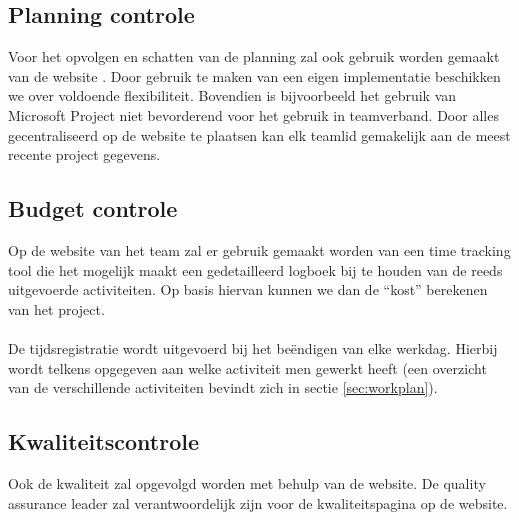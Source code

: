\subsection{Planning controle}
Voor het opvolgen en schatten van de planning zal ook gebruik worden gemaakt van de website \cite{portalWebsite}. Door gebruik te maken van een eigen implementatie beschikken we over voldoende flexibiliteit. Bovendien is bijvoorbeeld het gebruik van Microsoft Project \cite{MicrosoftProject} niet bevorderend voor het gebruik in teamverband. Door alles gecentraliseerd op de website te plaatsen kan elk teamlid gemakelijk aan de meest recente project gegevens.

\subsection{Budget controle}
Op de website van het team \cite{portalWebsite} zal er gebruik gemaakt worden van een time tracking tool die het mogelijk maakt een gedetailleerd logboek bij te houden van de reeds uitgevoerde activiteiten. Op basis hiervan kunnen we dan de ``kost'' berekenen van het project. 
\\
\\
De tijdsregistratie wordt uitgevoerd bij het be\"{e}ndigen van elke werkdag. Hierbij wordt telkens opgegeven aan welke activiteit men gewerkt heeft (een overzicht van de verschillende activiteiten bevindt zich in sectie \ref{sec:workplan}).

\subsection{Kwaliteitscontrole}
Ook de kwaliteit zal opgevolgd worden met behulp van de website. De quality assurance leader zal verantwoordelijk zijn voor de kwaliteitspagina op de website.

